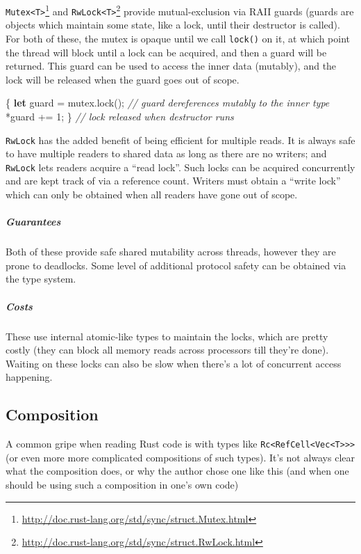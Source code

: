 \documentclass[a4paper,]{book}
\newenvironment{Shaded}{\begin{snugshade}}{\end{snugshade}}
\newcommand{\KeywordTok}[1]{\textcolor[rgb]{0.13,0.29,0.53}{\textbf{{#1}}}}
\newcommand{\DecValTok}[1]{\textcolor[rgb]{0.00,0.00,0.81}{{#1}}}
\newcommand{\CommentTok}[1]{\textcolor[rgb]{0.56,0.35,0.01}{\textit{{#1}}}}
\newcommand{\NormalTok}[1]{{#1}}
\renewcommand{\href}[2]{#2\footnote{\url{#1}}}
\let\oldsubparagraph\subparagraph
\renewcommand{\subparagraph}[1]{\oldsubparagraph{#1}\mbox{}}
\begin{document}
\href{http://doc.rust-lang.org/std/sync/struct.Mutex.html}{\texttt{Mutex\textless{}T\textgreater{}}}
and
\href{http://doc.rust-lang.org/std/sync/struct.RwLock.html}{\texttt{RwLock\textless{}T\textgreater{}}}
provide mutual-exclusion via RAII guards (guards are objects which
maintain some state, like a lock, until their destructor is called). For
both of these, the mutex is opaque until we call \texttt{lock()} on it,
at which point the thread will block until a lock can be acquired, and
then a guard will be returned. This guard can be used to access the
inner data (mutably), and the lock will be released when the guard goes
out of scope.

\begin{Shaded}
\begin{Highlighting}[]
\NormalTok{\{}
    \KeywordTok{let} \NormalTok{guard = mutex.lock();}
    \CommentTok{// guard dereferences mutably to the inner type}
    \NormalTok{*guard += }\DecValTok{1}\NormalTok{;}
\NormalTok{\} }\CommentTok{// lock released when destructor runs}
\end{Highlighting}
\end{Shaded}

\texttt{RwLock} has the added benefit of being efficient for multiple
reads. It is always safe to have multiple readers to shared data as long
as there are no writers; and \texttt{RwLock} lets readers acquire a
``read lock''. Such locks can be acquired concurrently and are kept
track of via a reference count. Writers must obtain a ``write lock''
which can only be obtained when all readers have gone out of scope.

\subparagraph{Guarantees}\label{guarantees-4}

Both of these provide safe shared mutability across threads, however
they are prone to deadlocks. Some level of additional protocol safety
can be obtained via the type system.

\subparagraph{Costs}\label{costs}

These use internal atomic-like types to maintain the locks, which are
pretty costly (they can block all memory reads across processors till
they're done). Waiting on these locks can also be slow when there's a
lot of concurrent access happening.

\subsection{Composition}\label{composition}

A common gripe when reading Rust code is with types like
\texttt{Rc\textless{}RefCell\textless{}Vec\textless{}T\textgreater{}\textgreater{}\textgreater{}}
(or even more more complicated compositions of such types). It's not
always clear what the composition does, or why the author chose one like
this (and when one should be using such a composition in one's own code)
\end{document}
